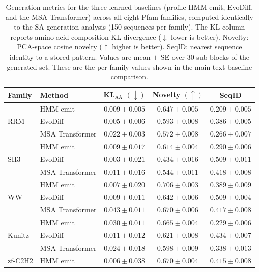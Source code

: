 \begin{table}[ht]
\centering
\caption{Generation metrics for the three learned baselines (profile HMM emit, EvoDiff, and the MSA Transformer) across all eight Pfam families, computed identically to the SA generation analysis (150 sequences per family). The KL column reports amino acid composition KL divergence ($\downarrow$ lower is better). Novelty: PCA-space cosine novelty ($\uparrow$ higher is better). SeqID: nearest sequence identity to a stored pattern. Values are mean $\pm$ SE over 30 sub-blocks of the generated set. These are the per-family values shown in the main-text baseline comparison.}
\label{tab:baseline-metrics}
\small
\begin{tabular}{@{}llccc@{}}
\toprule
Family & Method & KL$_{\mathrm{AA}}$ $(\downarrow)$ & Novelty $(\uparrow)$ & SeqID \\
\midrule
\multirow{3}{*}{RRM}
 & HMM emit        & $0.009 \pm 0.005$ & $0.647 \pm 0.005$ & $0.209 \pm 0.005$ \\
 & EvoDiff         & $0.005 \pm 0.006$ & $0.593 \pm 0.008$ & $0.386 \pm 0.005$ \\
 & MSA Transformer & $0.022 \pm 0.003$ & $0.572 \pm 0.008$ & $0.266 \pm 0.007$ \\
\midrule
\multirow{3}{*}{SH3}
 & HMM emit        & $0.009 \pm 0.017$ & $0.614 \pm 0.004$ & $0.290 \pm 0.006$ \\
 & EvoDiff         & $0.003 \pm 0.021$ & $0.434 \pm 0.016$ & $0.509 \pm 0.011$ \\
 & MSA Transformer & $0.011 \pm 0.016$ & $0.544 \pm 0.011$ & $0.418 \pm 0.008$ \\
\midrule
\multirow{3}{*}{WW}
 & HMM emit        & $0.007 \pm 0.020$ & $0.706 \pm 0.003$ & $0.389 \pm 0.009$ \\
 & EvoDiff         & $0.009 \pm 0.011$ & $0.642 \pm 0.006$ & $0.509 \pm 0.004$ \\
 & MSA Transformer & $0.043 \pm 0.011$ & $0.670 \pm 0.006$ & $0.417 \pm 0.008$ \\
\midrule
\multirow{3}{*}{Kunitz}
 & HMM emit        & $0.030 \pm 0.011$ & $0.665 \pm 0.004$ & $0.229 \pm 0.006$ \\
 & EvoDiff         & $0.011 \pm 0.012$ & $0.621 \pm 0.008$ & $0.434 \pm 0.007$ \\
 & MSA Transformer & $0.024 \pm 0.018$ & $0.598 \pm 0.009$ & $0.338 \pm 0.013$ \\
\midrule
\multirow{3}{*}{zf-C2H2}
 & HMM emit        & $0.006 \pm 0.038$ & $0.670 \pm 0.004$ & $0.415 \pm 0.008$ \\

\end{tabular}
\end{table}
